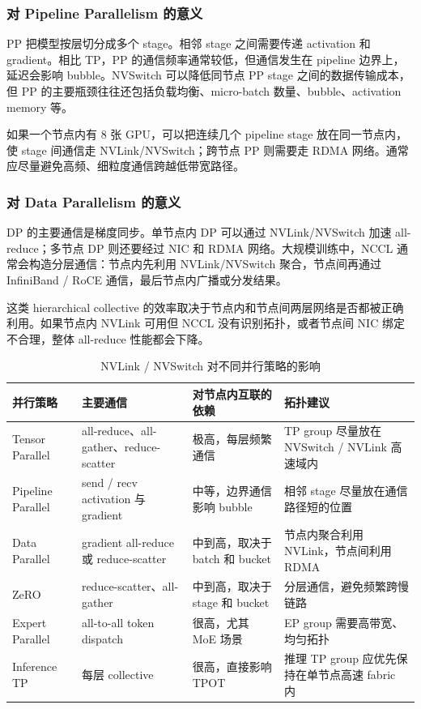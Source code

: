 \subsubsection{对 Pipeline Parallelism 的意义}

PP 把模型按层切分成多个 stage。相邻 stage 之间需要传递 activation 和 gradient。相比 TP，PP 的通信频率通常较低，但通信发生在 pipeline 边界上，延迟会影响 bubble。NVSwitch 可以降低同节点 PP stage 之间的数据传输成本，但 PP 的主要瓶颈往往还包括负载均衡、micro-batch 数量、bubble、activation memory 等。

如果一个节点内有 8 张 GPU，可以把连续几个 pipeline stage 放在同一节点内，使 stage 间通信走 NVLink/NVSwitch；跨节点 PP 则需要走 RDMA 网络。通常应尽量避免高频、细粒度通信跨越低带宽路径。

\subsubsection{对 Data Parallelism 的意义}

DP 的主要通信是梯度同步。单节点内 DP 可以通过 NVLink/NVSwitch 加速 all-reduce；多节点 DP 则还要经过 NIC 和 RDMA 网络。大规模训练中，NCCL 通常会构造分层通信：节点内先利用 NVLink/NVSwitch 聚合，节点间再通过 InfiniBand / RoCE 通信，最后节点内广播或分发结果。

这类 hierarchical collective 的效率取决于节点内和节点间两层网络是否都被正确利用。如果节点内 NVLink 可用但 NCCL 没有识别拓扑，或者节点间 NIC 绑定不合理，整体 all-reduce 性能都会下降。

\begin{table}[H]
  \centering
  \caption{NVLink / NVSwitch 对不同并行策略的影响}
  \label{tab:nvlink-parallelism-impact}
  \begin{tabular}{p{3.0cm}p{4.0cm}p{4.2cm}p{3.5cm}}
    \toprule
    并行策略 & 主要通信 & 对节点内互联的依赖 & 拓扑建议 \\
    \midrule
    Tensor Parallel & all-reduce、all-gather、reduce-scatter & 极高，每层频繁通信 & TP group 尽量放在 NVSwitch / NVLink 高速域内 \\
    Pipeline Parallel & send / recv activation 与 gradient & 中等，边界通信影响 bubble & 相邻 stage 尽量放在通信路径短的位置 \\
    Data Parallel & gradient all-reduce 或 reduce-scatter & 中到高，取决于 batch 和 bucket & 节点内聚合利用 NVLink，节点间利用 RDMA \\
    ZeRO & reduce-scatter、all-gather & 中到高，取决于 stage 和 bucket & 分层通信，避免频繁跨慢链路 \\
    Expert Parallel & all-to-all token dispatch & 很高，尤其 MoE 场景 & EP group 需要高带宽、均匀拓扑 \\
    Inference TP & 每层 collective & 很高，直接影响 TPOT & 推理 TP group 应优先保持在单节点高速 fabric 内 \\
    \bottomrule
  \end{tabular}
\end{table}

